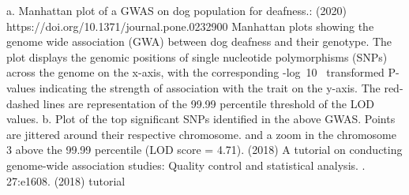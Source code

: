 \markdownRendererBlockQuoteEnd \markdownRendererInterblockSeparator
{}\markdownRendererOlBeginTight
{}a. Manhattan plot of a GWAS on dog population for deafness.:  (2020) https://doi.org/10.1371/journal.pone.0232900\markdownRendererOlItemEnd 
\markdownRendererOlEndTight \markdownRendererInterblockSeparator
{} \markdownRendererInterblockSeparator
{}\markdownRendererBlockQuoteBegin
Manhattan plots showing the genome wide association (GWA) between dog deafness and their genotype. The plot displays the genomic positions of single nucleotide polymorphisms (SNPs) across the genome on the x-axis, with the corresponding -log~10~ transformed P-values indicating the strength of association with the trait on the y-axis. The red-dashed lines are representation of the 99.99 percentile threshold of the LOD values.
\markdownRendererBlockQuoteEnd \markdownRendererInterblockSeparator
{}\markdownRendererOlBeginTight
{}b. Plot of the top significant SNPs identified in the above GWAS.\markdownRendererOlItemEnd 
\markdownRendererOlEndTight \markdownRendererInterblockSeparator
{}Points are jittered around their respective chromosome.\markdownRendererInterblockSeparator
{}\markdownRendererInterblockSeparator
{}\markdownRendererBlockQuoteBegin
and a zoom in the chromosome 3 above the 99.99 percentile (LOD score = 4.71).
\markdownRendererBlockQuoteEnd \markdownRendererInterblockSeparator
{}\markdownRendererInterblockSeparator
{}
\markdownRendererSectionEnd \markdownRendererSectionBegin
{}\markdownRendererInterblockSeparator
{}\markdownRendererUlBegin
\markdownRendererUlItem {} (2018) A tutorial on conducting genome-wide association studies: Quality control and statistical analysis. . 27:e1608. \markdownRendererUlItemEnd 
\markdownRendererUlItem {} (2018) tutorial \markdownRendererUlItemEnd 
